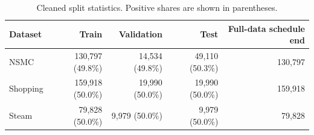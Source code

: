 \begin{table}[t]
\centering
\caption{Cleaned split statistics. Positive shares are shown in parentheses.}
\label{tab:datasets}
\small
\begin{tabular}{lrrrr}
\toprule
Dataset & Train & Validation & Test & Full-data schedule end \\
\midrule
NSMC & 130,797 (49.8\%) & 14,534 (49.8\%) & 49,110 (50.3\%) & 130,797 \\
Shopping & 159,918 (50.0\%) & 19,990 (50.0\%) & 19,990 (50.0\%) & 159,918 \\
Steam & 79,828 (50.0\%) & 9,979 (50.0\%) & 9,979 (50.0\%) & 79,828 \\
\bottomrule
\end{tabular}
\end{table}
